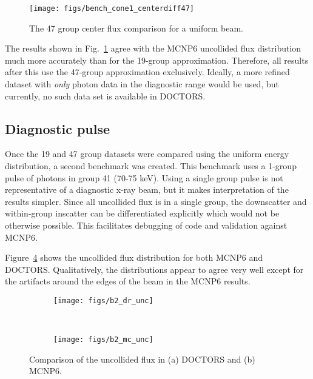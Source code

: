 \begin{figure}[tb]
  \begin{center}
   \texttt{[image: figs/bench\_cone1\_centerdiff47]}
  \end{center}
  \caption{The 47 group center flux comparison for a uniform beam.}
\label{fig:bench_cone1_centerdiff47}
\end{figure}

The results shown in Fig.~\ref{fig:bench_cone1_centerdiff47} agree with the MCNP6 uncollided flux distribution much more accurately than for the 19-group approximation. Therefore, all results after this use the 47-group approximation exclusively. Ideally, a more refined dataset with \textit{only} photon data in the diagnostic range would be used, but currently, no such data set is available in DOCTORS.

\subsection{Diagnostic pulse}
Once the 19 and 47 group datasets were compared using the uniform energy distribution, a second benchmark was created. This benchmark uses a 1-group pulse of photons in group 41 (70-75 keV). Using a single group pulse is not representative of a diagnostic x-ray beam, but it makes interpretation of the results simpler. Since all uncollided flux is in a single group, the downscatter and within-group inscatter can be differentiated explicitly which would not be otherwise possible. This facilitates debugging of code and validation against MCNP6.

Figure~\ref{fig:b2_unc} shows the uncollided flux distribution for both MCNP6 and DOCTORS. Qualitatively, the distributions appear to agree very well except for the artifacts around the edges of the beam in the MCNP6 results.


\begin{figure}
    \centering
    \begin{subfigure}[b]{0.45\textwidth}
        \texttt{[image: figs/b2\_dr\_unc]}
        \caption{}
        \label{fig:bench_cone1_centerdiff}
    \end{subfigure}
    ~
    \begin{subfigure}[b]{0.45\textwidth}
        \texttt{[image: figs/b2\_mc\_unc]}
        \caption{}
        \label{fig:bench_cone1_centerdiff2}
    \end{subfigure}
    \caption{Comparison of the uncollided flux in (a) DOCTORS and (b) MCNP6. }\label{fig:b2_unc}
\end{figure}

